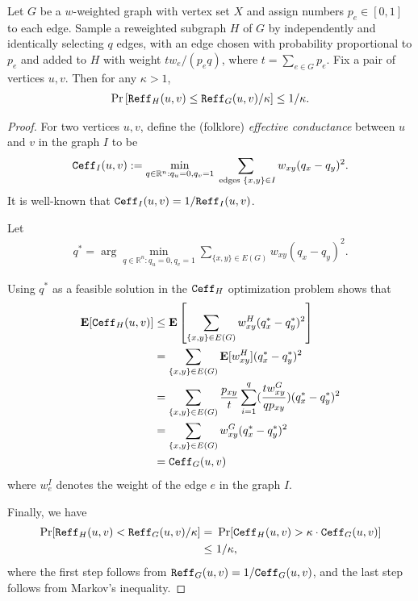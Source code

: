 \begin{lemma}\label{lem:sparse-lower-tail}
Let $G$ be a $w$-weighted graph with vertex set $X$ and assign numbers $p_e\in [0,1]$ to each edge. Sample a reweighted subgraph $H$ of $G$ by independently and identically selecting $q$ edges, with an edge chosen with probability proportional to $p_e$ and added to $H$ with weight $t w_e/(p_eq)$, where $t = \sum_{e \in G} p_e$. Fix a pair of vertices $u,v$. Then for any $\kappa > 1$,
\begin{align*}
    \Pr \left[\mathtt{Reff}_H(u,v)\le \mathtt{Reff}_G(u,v)/\kappa \right] \le 1/\kappa.
\end{align*}
\end{lemma}

\begin{proof}
For two vertices $u,v$, define the (folklore) \emph{effective conductance} between $u$ and $v$ in the graph $I$ to be
\begin{align*}
\mathtt{Ceff}_I(u,v) := \min_{q\in \mathbb{R}^n: q_u = 0,q_v = 1} \sum_{\text{ edges } \{x,y\} \in I} w_{xy}(q_x - q_y)^2 .
\end{align*}
It is well-known that $\mathtt{Ceff}_I(u,v) = 1/\mathtt{Reff}_I(u,v)$.

 Let 
\begin{align*}
 q^* = \arg\min_{q\in \mathbb{R}^n: q_u = 0, q_v = 1} \sum_{\{x,y\} \in E(G)} w_{xy}(q_x - q_y)^2.
\end{align*} 

Using $q^*$ as a feasible solution in the $\mathtt{Ceff}_H$ optimization problem shows that
\begin{align*}
\textbf{E}[\mathtt{Ceff}_H(u,v)] &\le \textbf{E} \left[\sum_{\{x,y\}\in E(G)} w_{xy}^H(q^*_x - q^*_y)^2 \right]\\
&= \sum_{\{x,y\}\in E(G)} \textbf{E}[w_{xy}^H](q^*_x - q^*_y)^2\\
&= \sum_{\{x,y\}\in E(G)} \frac{p_{xy}}{t}\sum_{i=1}^q (\frac{t w_{xy}^G}{q p_{xy}})(q^*_x - q^*_y)^2\\
&= \sum_{\{x,y\}\in E(G)} w_{xy}^G(q^*_x - q^*_y)^2\\
&= \mathtt{Ceff}_G(u,v)
\end{align*}
where $w^I_e$ denotes the weight of the edge $e$ in the graph $I$.

Finally, we have 
\begin{align*}
\Pr[\mathtt{Reff}_H(u,v) < \mathtt{Reff}_G(u,v)/\kappa]
= & ~ \Pr[\mathtt{Ceff}_H(u,v) > \kappa \cdot \mathtt{Ceff}_G(u,v)]\\
\le & ~ 1/\kappa,
\end{align*}
where the first step follows from $\mathtt{Reff}_G(u,v) = 1 / \mathtt{Ceff}_G(u,v)$, and the last step follows from Markov's inequality.
\end{proof}

